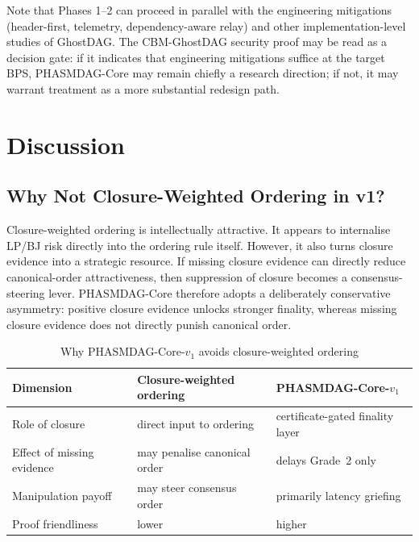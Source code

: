 \documentclass[11pt]{article}
\theoremstyle{definition}
\theoremstyle{plain}
\theoremstyle{remark}
\begin{document}
Note that Phases 1--2 can proceed in parallel with the engineering mitigations
(header-first, telemetry, dependency-aware relay) and other implementation-level
studies of GhostDAG.  The CBM-GhostDAG security proof may be read as a decision
gate: if it indicates that engineering mitigations suffice at the target BPS,
PHASMDAG-Core may remain chiefly a research direction; if not, it may warrant
treatment as a more substantial redesign path.

\section{Discussion}\label{sec:discussion}

\subsection{Why Not Closure-Weighted Ordering in v1?}

Closure-weighted ordering is intellectually attractive.
It appears to internalise LP/BJ risk directly into the ordering rule itself.
However, it also turns closure evidence into a strategic resource.
If missing closure evidence can directly reduce canonical-order attractiveness,
then suppression of closure becomes a consensus-steering lever.
PHASMDAG-Core therefore adopts a deliberately conservative asymmetry:
positive closure evidence unlocks stronger finality, whereas missing closure
evidence does not directly punish canonical order.

\begin{table}[tbp]
\centering
\caption{Why PHASMDAG-Core-$v_1$ avoids closure-weighted ordering}
\label{tab:dwc_vs_closure_risk}
\small
\renewcommand{\arraystretch}{1.1}
\begin{tabularx}{0.98\textwidth}{@{}L{3.2cm}YY@{}}
\toprule
\textbf{Dimension} & \textbf{Closure-weighted ordering} & \textbf{PHASMDAG-Core-$v_1$} \\
\midrule
Role of closure
    & direct input to ordering
    & certificate-gated finality layer \\
Effect of missing evidence
    & may penalise canonical order
    & delays Grade~2 only \\
Manipulation payoff
    & may steer consensus order
    & primarily latency griefing \\
Proof friendliness
    & lower
    & higher \\
\bottomrule
\end{tabularx}
\end{table}
\end{document}
